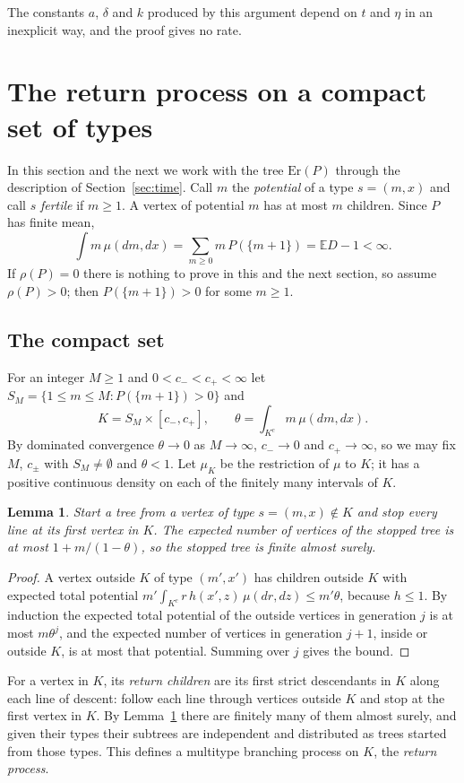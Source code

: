 \documentclass[11pt]{amsart}
\newtheorem{lemma}[theorem]{Lemma}
\theoremstyle{remark}
\numberwithin{equation}{section}
\newcommand{\E}{\mathbb E}
\newcommand{\1}{\mathbf 1}
\newcommand{\Er}{\mathrm{Er}}
\begin{document}
The constants $a$, $\delta$ and $k$ produced by this argument depend on $t$ and $\eta$ in an inexplicit way, and the proof gives no rate.

\section{The return process on a compact set of types}\label{sec:return}

In this section and the next we work with the tree $\Er(P)$ through the description of Section~\ref{sec:time}. Call $m$ the \emph{potential} of a type $s=(m,x)$ and call $s$ \emph{fertile} if $m\ge1$. A vertex of potential $m$ has at most $m$ children. Since $P$ has finite mean,
\[
\int m\,\mu(dm,dx)=\sum_{m\ge0}m\,P(\{m+1\})=\E D-1<\infty .
\]
If $\rho(P)=0$ there is nothing to prove in this and the next section, so assume $\rho(P)>0$; then $P(\{m+1\})>0$ for some $m\ge1$.

\subsection{The compact set}
For an integer $M\ge1$ and $0<c_-<c_+<\infty$ let $S_M=\{1\le m\le M:P(\{m+1\})>0\}$ and
\[
K=S_M\times[c_-,c_+],\qquad \theta=\int_{K^c}m\,\mu(dm,dx).
\]
By dominated convergence $\theta\to0$ as $M\to\infty$, $c_-\to0$ and $c_+\to\infty$, so we may fix $M$, $c_\pm$ with $S_M\ne\emptyset$ and $\theta<1$. Let $\mu_K$ be the restriction of $\mu$ to $K$; it has a positive continuous density on each of the finitely many intervals of $K$.

\begin{lemma}\label{lem:outside}
Start a tree from a vertex of type $s=(m,x)\notin K$ and stop every line at its first vertex in $K$. The expected number of vertices of the stopped tree is at most $1+m/(1-\theta)$, so the stopped tree is finite almost surely.
\end{lemma}

\begin{proof}
A vertex outside $K$ of type $(m',x')$ has children outside $K$ with expected total potential $m'\int_{K^c}r\,h(x',z)\,\mu(dr,dz)\le m'\theta$, because $h\le1$. By induction the expected total potential of the outside vertices in generation $j$ is at most $m\theta^j$, and the expected number of vertices in generation $j+1$, inside or outside $K$, is at most that potential. Summing over $j$ gives the bound.
\end{proof}

For a vertex in $K$, its \emph{return children} are its first strict descendants in $K$ along each line of descent: follow each line through vertices outside $K$ and stop at the first vertex in $K$. By Lemma~\ref{lem:outside} there are finitely many of them almost surely, and given their types their subtrees are independent and distributed as trees started from those types. This defines a multitype branching process on $K$, the \emph{return process}.
\end{document}
